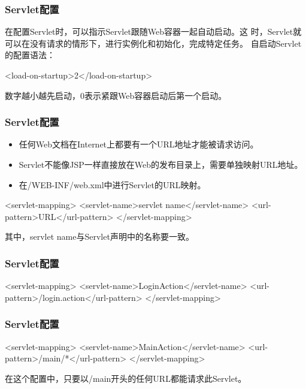 \begin{frame}[fragile] %
\frametitle{Servlet配置}

在配置Servlet时，可以指示Servlet跟随Web容器一起自动启动。这
时，Servlet就可以在没有请求的情形下，进行实例化和初始化，完成特定任务。
自启动Servlet的配置语法：

\begin{xmlCode}
<load-on-startup>2</load-on-startup>
\end{xmlCode}

数字越小越先启动，0表示紧跟Web容器启动后第一个启动。
\end{frame}

\begin{frame}[fragile] %
\frametitle{Servlet配置}
\begin{itemize}
\item 任何Web文档在Internet上都要有一个URL地址才能被请求访问。
\item Servlet不能像JSP一样直接放在Web的发布目录上，需要单独映射URL地址。
\item 在{\Red /WEB-INF/web.xml}中进行Servlet的URL映射。
\end{itemize}


\begin{xmlCode}
<servlet-mapping>
  <servlet-name>servlet name</servlet-name>
  <url-pattern>URL</url-pattern>
</servlet-mapping>
\end{xmlCode}
{\kai 其中，servlet name与Servlet声明中的名称要一致。}
\end{frame}

\begin{frame}[fragile] %
\frametitle{Servlet配置}

\begin{xmlCode}
<servlet-mapping>
  <servlet-name>LoginAction</servlet-name>
  <url-pattern>/login.action</url-pattern>
</servlet-mapping>
\end{xmlCode}
\end{frame}

\begin{frame}[fragile] %
\frametitle{Servlet配置}

\begin{xmlCode}
<servlet-mapping>
  <servlet-name>MainAction</servlet-name>
  <url-pattern>/main/*</url-pattern>
</servlet-mapping>
\end{xmlCode}

在这个配置中，只要以/main开头的任何URL都能请求此Servlet。
\end{frame}

